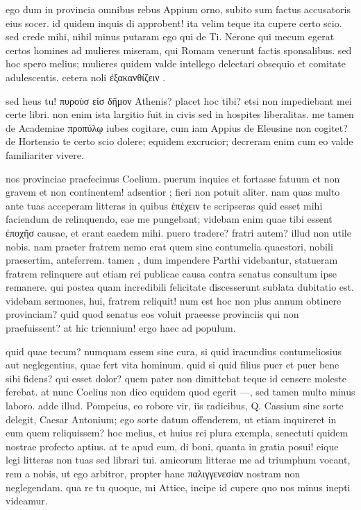 


 ego dum in provincia omnibus rebus Appium orno, subito sum factus accusatoris eius socer. id quidem inquis di approbent! ita velim teque ita cupere certo scio. sed crede mihi, nihil minus putaram ego qui de Ti. Nerone qui mecum egerat certos homines ad mulieres miseram, qui Romam venerunt factis sponsalibus. sed hoc spero melius; mulieres quidem valde intellego delectari obsequio et comitate adulescentis. cetera noli ἐξακανθίζειν .

 sed heus tu! πυροὺσ εἰσ δῆμον Athenis? placet hoc tibi? etsi non impediebant mei certe libri. non enim ista largitio fuit in civis sed in hospites liberalitas. me tamen de Academiae προπύλῳ iubes cogitare, cum iam Appius de Eleusine non cogitet? de Hortensio te certo scio dolere; equidem excrucior; decreram enim cum eo valde familiariter vivere.

 nos provinciae praefecimus Coelium. puerum inquies et fortasse fatuum et non gravem et non continentem! adsentior ; fieri non potuit aliter. nam quas multo ante tuas acceperam litteras in quibus ἐπέχειν te scripseras quid esset mihi faciendum de relinquendo, eae me pungebant; videbam enim quae tibi essent ἐποχῆσ causae, et erant eaedem mihi. puero tradere? fratri autem? illud non utile nobis. nam praeter fratrem nemo erat quem sine contumelia quaestori, nobili praesertim, anteferrem. tamen , dum impendere Parthi videbantur, statueram fratrem relinquere aut etiam rei publicae causa contra senatus consultum ipse remanere. qui postea quam incredibili felicitate discesserunt sublata dubitatio est. videbam sermones, hui, fratrem reliquit! num est hoc non plus annum obtinere provinciam? quid quod senatus eos voluit praeesse provinciis qui non praefuissent? at hic triennium! ergo haec ad populum.

 quid quae tecum? numquam essem sine cura, si quid iracundius contumeliosius aut neglegentius, quae fert vita hominum. quid si quid filius puer et puer bene sibi fidens? qui esset dolor? quem pater non dimittebat teque id censere moleste ferebat. at nunc Coelius non dico equidem quod egerit —, sed tamen multo minus laboro. adde illud. Pompeius, eo robore vir, iis radicibus, Q. Cassium sine sorte delegit, Caesar Antonium; ego sorte datum offenderem, ut etiam inquireret in eum quem reliquissem? hoc melius, et huius rei plura exempla, senectuti quidem nostrae profecto aptius. at te apud eum, di boni, quanta in gratia posui! eique legi litteras non tuas sed librari tui. amicorum litterae me ad triumphum vocant, rem a nobis, ut ego arbitror, propter hanc παλιγγενεσίαν nostram non neglegendam. qua re tu quoque, mi Attice, incipe id cupere quo nos minus inepti videamur.
